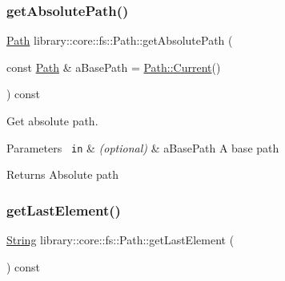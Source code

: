 \subsubsection{\texorpdfstring{getAbsolutePath()}{getAbsolutePath()}}
{\footnotesize\ttfamily \mbox{\hyperlink{classlibrary_1_1core_1_1fs_1_1_path}{Path}} library\+::core\+::fs\+::\+Path\+::get\+Absolute\+Path (\begin{DoxyParamCaption}\item[{const \mbox{\hyperlink{classlibrary_1_1core_1_1fs_1_1_path}{Path}} \&}]{a\+Base\+Path = {\ttfamily \mbox{\hyperlink{classlibrary_1_1core_1_1fs_1_1_path_adbdaa4e7ab2a1b399746782668863e53}{Path\+::\+Current}}()} }\end{DoxyParamCaption}) const}



Get absolute path. 


\begin{DoxyCode}{0}
\end{DoxyCode}



\begin{DoxyParams}[1]{Parameters}
\mbox{\texttt{ in}}  & {\em (optional)} & a\+Base\+Path A base path \\
\hline
\end{DoxyParams}
\begin{DoxyReturn}{Returns}
Absolute path 
\end{DoxyReturn}
\mbox{\label{classlibrary_1_1core_1_1fs_1_1_path_a1beabf215fcc96dde591838556e00370}} 
\subsubsection{\texorpdfstring{getLastElement()}{getLastElement()}}
{\footnotesize\ttfamily \mbox{\hyperlink{classlibrary_1_1core_1_1types_1_1_string}{String}} library\+::core\+::fs\+::\+Path\+::get\+Last\+Element (\begin{DoxyParamCaption}{ }\end{DoxyParamCaption}) const}



